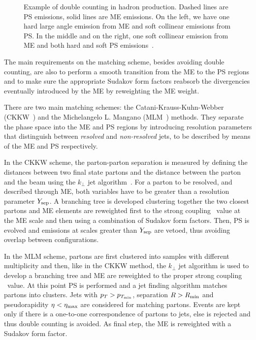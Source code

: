 \begin{figure}[htb]\begin{center}
	\caption{Example of double counting in hadron production. Dashed lines
        are PS emissions, solid lines are ME emissions. On the left, we have one
        hard large angle emission from ME and soft collinear emissions from PS.
        In the middle and on the right, one soft collinear emission from ME 
        and both hard and soft PS emissions~\cite{Ambroglini:2009nz}.
        \label{fig:matchfig1}}
\end{center}\end{figure}

The main requirements on the matching scheme, besides avoiding double counting,
are also to perform a smooth transition from the ME to the PS regions and to make
sure the appropriate Sudakov form factors reabsorb the divergencies eventually
introduced by the ME by reweighting the ME weight.

There are two main matching schemes: the Catani-Krauss-Kuhn-Webber 
(CKKW~\cite{Catani:2001cc}) and the Michelangelo L. Mangano 
(MLM~\cite{Mangano:2006rw}) methods.
They separate the phase space into the ME and PS regions by
introducing resolution parameters that distinguish between
{\it resolved} and {\it non-resolved} jets, to be described by
means of the ME and PS respectively.

In the CKKW scheme, the parton-parton separation is measured by defining
the distances between two final state partons and the distance between the 
parton and the beam using the $k_\perp$ jet algorithm~\cite{Catani1991432}. 
For a parton to be resolved, and described through ME,
both variables have to be greater than a resolution parameter $Y_{\rm sep}$. 
A branching tree is developed clustering together the two closest partons
and  ME elements are reweighted first to the strong coupling \alphas\ value 
at the ME scale and then using a combination of Sudakov form factors.
Then, PS is evolved and emissions at scales greater than 
$Y_{\rm sep}$ are vetoed, thus avoiding overlap between configurations. 

In the MLM scheme, partons are first clustered into samples with different 
multiplicity and then, like in the CKKW method, the $k_\perp$ jet algorithm
is used to develop a branching tree and ME are reweighted to the proper strong 
coupling \alphas\ value. At this point PS is performed and a jet finding algorithm
matches partons into clusters. Jets with 
$p_T>p_{T_{\rm min}}$, separation $R>R_{\rm min}$ and 
pseudorapidity $\eta<\eta_{\rm max}$ are considered for matching 
partons. Events are kept only if there is a one-to-one correspondence 
of partons to jets, else is rejected and thus double counting is avoided.
As final step, the ME is reweighted with a Sudakov form factor.


